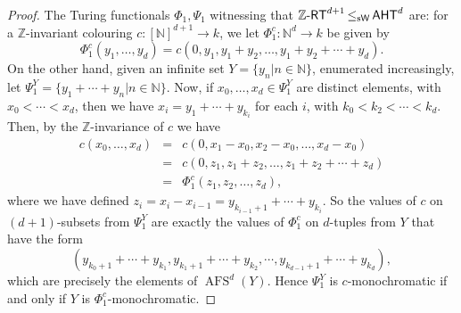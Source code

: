 \documentclass[10pt,a4paper]{amsart}
\newcommand{\zrt}{\mathnormal{\mathbb Z\text{-}\mathsf{RT}}}
\newcommand{\aht}{\mathnormal{\mathsf{AHT}}}
\newcommand{\weisleq}{\mathop{\leq_{\mathrm{s}\mathsf{W}}}}
\DeclareMathOperator{\afs}{AFS}
\theoremstyle{definition}
\begin{document}
\begin{proof}
The Turing functionals $\Phi_1,\Psi_1$ witnessing that $\zrt^{d+1}\weisleq\aht^d$ are: for a $\mathbb Z$-invariant colouring $c:[\mathbb N]^{d+1}\longrightarrow k$, we let $\Phi_1^c:\mathbb N^d\longrightarrow k$ be given by
\begin{equation*}
\Phi_1^c(y_1,\ldots,y_d)=c(0,y_1,y_1+y_2,\ldots,y_1+y_2+\cdots+y_d).
\end{equation*}
On the other hand, given an infinite set $Y=\{y_n\big|n\in\mathbb N\}$, enumerated increasingly, let $\Psi_1^Y=\{y_1+\cdots+y_n\big|n\in\mathbb N\}$. %
Now, if $x_0,\ldots,x_d\in\Psi_1^Y$ are distinct elements, with $x_0<\cdots<x_d$, then we have 
$x_i=y_1+\cdots+y_{k_i}$ for each $i$, with
$k_0<k_2<\cdots<k_d$. Then, by the $\mathbb Z$-invariance of $c$ we have
\begin{eqnarray*}
c(x_0,\ldots,x_d) & = & c(0,x_1-x_0,x_2-x_0,\ldots,x_d-x_0) \\
 & = & c(0,z_1,z_1+z_2,\ldots,z_1+z_2+\cdots+z_d) \\
 & = & \Phi_1^c(z_1,z_2,\ldots,z_d),
\end{eqnarray*}
where we have defined $z_i=x_i-x_{i-1}=y_{k_{i-1}+1}+\cdots+y_{k_i}$. So the values of $c$ on $(d+1)$-subsets from $\Psi_1^Y$ are exactly the values of $\Phi_1^c$ on $d$-tuples from $Y$ that have the form
\begin{equation*}
(y_{k_0+1}+\cdots+y_{k_1},y_{k_1+1}+\cdots+y_{k_2},\cdots,y_{k_{d-1}+1}+\cdots+y_{k_d}),
\end{equation*}
which are precisely the elements of $\afs^d(Y)$. Hence $\Psi_1^Y$ is $c$-monochromatic if and only if $Y$ is $\Phi_1^c$-monochromatic.


\end{proof}
\end{document}
